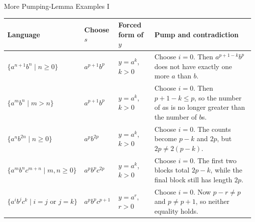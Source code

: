 \documentclass[10pt,aspectratio=169]{beamer}
\begin{document}
\begin{frame}{More Pumping-Lemma Examples I}

\scriptsize
\renewcommand{\arraystretch}{1.35}
\setlength{\tabcolsep}{3pt}

\begin{center}
\begin{tabular}{p{3.0cm}p{2.4cm}p{2.3cm}p{5.3cm}}
\toprule
\textbf{Language} &
\textbf{Choose $s$} &
\textbf{Forced form of $y$} &
\textbf{Pump and contradiction} \\
\midrule

$\{a^{n+1}b^n\mid n\geq 0\}$ &
$a^{p+1}b^p$ &
$y=a^k$, $k>0$ &
Choose $i=0$. Then
$a^{p+1-k}b^p$ does not have exactly one more $a$ than $b$. \\

\addlinespace

$\{a^mb^n\mid m>n\}$ &
$a^{p+1}b^p$ &
$y=a^k$, $k>0$ &
Choose $i=0$. Then $p+1-k\leq p$, so the number of $a$s is no longer greater than the number of $b$s. \\

\addlinespace

$\{a^nb^{2n}\mid n\geq 0\}$ &
$a^pb^{2p}$ &
$y=a^k$, $k>0$ &
Choose $i=0$. The counts become $p-k$ and $2p$, but
$2p\neq 2(p-k)$. \\

\addlinespace

$\{a^mb^nc^{m+n}\mid m,n\geq 0\}$ &
$a^pb^pc^{2p}$ &
$y=a^k$, $k>0$ &
Choose $i=0$. The first two blocks total $2p-k$, while the final block still has length $2p$. \\

\addlinespace

$\{a^ib^jc^k\mid i=j\text{ or }j=k\}$ &
$a^pb^pc^{p+1}$ &
$y=a^r$, $r>0$ &
Choose $i=0$. Now $p-r\neq p$ and $p\neq p+1$, so neither equality holds. \\

\bottomrule
\end{tabular}
\end{center}

\end{frame}
\end{document}
